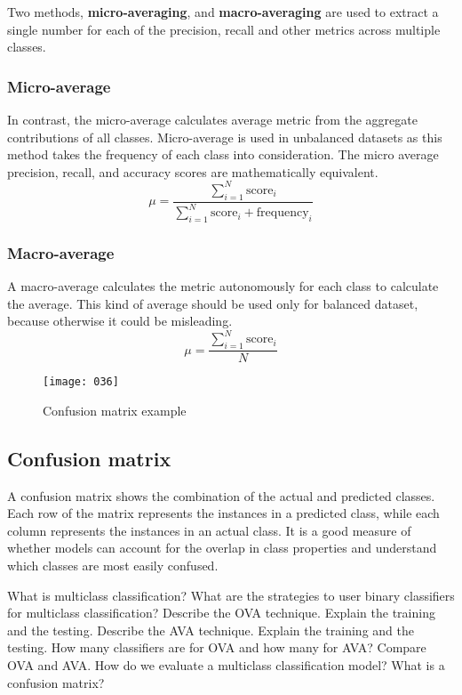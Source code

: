 Two methods, \textbf{micro-averaging}, and \textbf{macro-averaging} are used to extract a single number for each of the precision, recall and other metrics across multiple classes.

\subsubsection{Micro-average}
In contrast, the micro-average calculates average metric from the aggregate contributions of all classes. Micro-average is used in unbalanced datasets as this method takes the frequency of each class into consideration. The micro average precision, recall, and accuracy scores are mathematically equivalent.
\begin{equation}
	\mu = \frac {\sum_{i=1}^N \text{score}_i} {\sum_{i=1}^N \text{score}_i + \text{frequency}_i}
\end{equation}

\subsubsection{Macro-average}
A macro-average calculates the metric autonomously for each class to calculate the average. This kind of average should be used only for balanced dataset, because otherwise it could be misleading.
\begin{equation}
	\mu = \frac {\sum_{i=1}^N \text{score}_i} N
\end{equation}

\begin{figure}[t]
	\begin{center}
		\texttt{[image: 036]}
	\end{center}
	\caption{Confusion matrix example}
	\vspace*{-20pt}
	\label{fig:036}
\end{figure}
\subsection{Confusion matrix}
A confusion matrix shows the combination of the actual and predicted classes. Each row of the matrix represents the instances in a predicted class, while each column represents the instances in an actual class. It is a good measure of whether models can account for the overlap in class properties and understand which classes are most easily confused.

\newpage
\begin{exercise}[topsep=20pt,itemsep=10pt]
	\ex What is multiclass classification? 
	\ex What are the strategies to user binary classifiers for multiclass classification?
	\ex[!] Describe the OVA technique. Explain the training and the testing.
	\ex[!] Describe the AVA technique. Explain the training and the testing.
	\ex[!] How many classifiers are for OVA and how many for AVA?
	\ex[!] Compare OVA and AVA.
	\ex How do we evaluate a multiclass classification model?
	\ex What is a confusion matrix?
\end{exercise}